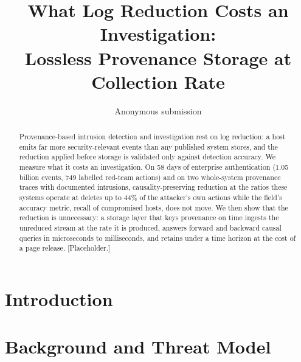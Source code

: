 \documentclass[letterpaper,twocolumn,10pt]{article}
\begin{document}
\date{}
\title{\Large \bf What Log Reduction Costs an Investigation:\\
Lossless Provenance Storage at Collection Rate}
\author{{\rm Anonymous submission}}
\maketitle

\begin{abstract}
Provenance-based intrusion detection and investigation rest on log
reduction: a host emits far more security-relevant events than any
published system stores, and the reduction applied before storage is
validated only against detection accuracy. We measure what it costs an
investigation. On 58 days of enterprise authentication (1.05 billion
events, 749 labelled red-team actions) and on two whole-system
provenance traces with documented intrusions, causality-preserving
reduction at the ratios these systems operate at deletes up to 44\% of
the attacker's own actions while the field's accuracy metric, recall of
compromised hosts, does not move. We then show that the reduction is
unnecessary: a storage layer that keys provenance on time ingests the
unreduced stream at the rate it is produced, answers forward and
backward causal queries in microseconds to milliseconds, and retains
under a time horizon at the cost of a page release. [Placeholder.]
\end{abstract}

\section{Introduction}

\section{Background and Threat Model}
\end{document}
